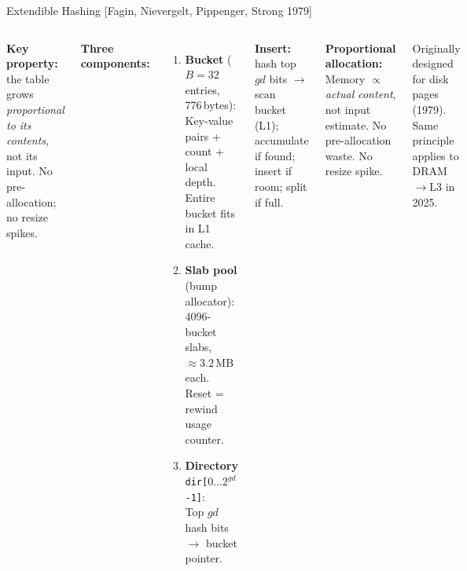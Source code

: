 \documentclass[aspectratio=169,t]{beamer}
\begin{document}
\begin{frame}{Extendible Hashing [Fagin, Nievergelt, Pippenger, Strong 1979]}
\begin{columns}[c]
\textbf{Key property:} the table grows \emph{proportional to its contents},
not its input. No pre-allocation; no resize spikes.

\vspace{0.15cm}
\textbf{Three components:}
\begin{enumerate}
  \item \textbf{Bucket} ($B=32$ entries, 776\,bytes):\\
        Key-value pairs + count + local depth.\\
        Entire bucket fits in L1 cache.
  \item \textbf{Slab pool} (bump allocator):\\
        4096-bucket slabs, $\approx 3.2$\,MB each.\\
        Reset = rewind usage counter.
  \item \textbf{Directory} \texttt{dir[$0\ldots 2^{gd}$-1]}:\\
        Top $gd$ hash bits $\to$ bucket pointer.
\end{enumerate}

\vspace{0.15cm}
\textbf{Insert:} hash top $gd$ bits $\to$ scan bucket (L1);
accumulate if found; insert if room; split if full.

\centering
{}

\vspace{0.2cm}
\textbf{Proportional allocation:}\\
Memory $\propto$ \emph{actual content}, not input estimate.
No pre-allocation waste. No resize spike.

\vspace{0.1cm}
{\small Originally designed for disk pages (1979). Same principle applies
to DRAM$\to$L3 in 2025.}
\end{columns}
\end{frame}
\end{document}
